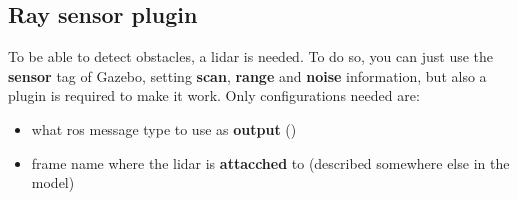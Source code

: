 \subsection{Ray sensor plugin}

To be able to detect obstacles, a lidar is needed. To do so, you can just use the \textbf{sensor} tag  of Gazebo, setting \textbf{scan}, \textbf{range} and \textbf{noise} information, but also a plugin is required to make it work. Only configurations needed are:
\begin{itemize}
    \item what \acrshort{ros} message type to use as \textbf{output} ()
    \item frame name where the lidar is \textbf{attacched} to (described somewhere else in the model)
\end{itemize}


